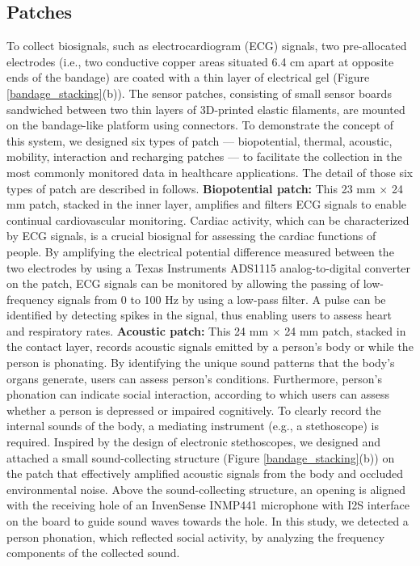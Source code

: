 \subsection{Patches}
To collect biosignals, such as electrocardiogram (ECG) signals, two pre-allocated electrodes (i.e., two conductive copper areas situated 6.4 cm apart at opposite ends of the bandage) are coated with a thin layer of electrical gel (Figure \ref{bandage_stacking}(b)).
The sensor patches, consisting of small sensor boards sandwiched between two thin layers of 3D-printed elastic filaments, are mounted on the bandage-like platform using connectors. To demonstrate the concept of this system, we designed six types of patch — biopotential, thermal, acoustic, mobility, interaction and recharging patches — to facilitate the collection in the most commonly monitored data in healthcare applications.
The detail of those six types of patch are described in follows.
\vspace{15pt}
\newline 
\textbf{Biopotential patch:}
\newline
This 23 mm × 24 mm patch, stacked in the inner layer, amplifies and filters ECG signals to enable continual cardiovascular monitoring. Cardiac activity, which can be characterized by ECG signals, is a crucial biosignal for assessing the cardiac functions of people. By amplifying the electrical potential difference measured between the two electrodes by using a Texas Instruments ADS1115 analog-to-digital converter on the patch, ECG signals can be monitored by allowing the passing of low-frequency signals from 0 to 100 Hz \cite{shaikh1995} by using a low-pass filter. A pulse can be identified by detecting spikes in the signal, thus enabling users to assess heart and respiratory rates.
\vspace{10pt}
\newline
\textbf{Acoustic patch:}
\newline
This 24 mm × 24 mm patch, stacked in the contact layer, records acoustic signals emitted by a person's body or while the person is phonating. By identifying the unique sound patterns that the body's organs generate, users can assess person's conditions. Furthermore, person's phonation can indicate social interaction, according to which users can assess whether a person is depressed or impaired cognitively.  To clearly record the internal sounds of the body, a mediating instrument (e.g., a stethoscope) is required. Inspired by the design of electronic stethoscopes, we designed and attached a small sound-collecting structure (Figure \ref{bandage_stacking}(b)) on the patch that effectively amplified acoustic signals from the body and occluded environmental noise. Above the sound-collecting structure, an opening is aligned with the receiving hole of an InvenSense INMP441 microphone with I2S interface on the board to guide sound waves towards the hole. In this study, we detected a person phonation, which reflected social activity, by analyzing the frequency components of the collected sound.
